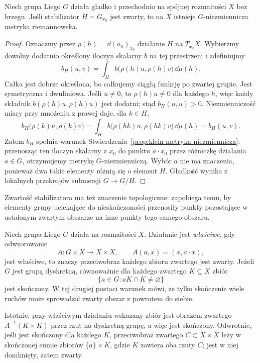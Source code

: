 \begin{stwierdzenie}
\label{prop:klein-zwarty-stabilizator-metryka}
Niech grupa Liego $G$ działa gładko i przechodnio na spójnej
rozmaitości $X$ bez brzegu. Jeśli stabilizator $H=G_{x_0}$ jest
zwarty, to na $X$ istnieje $G$-niezmiennicza metryka
riemannowska.
\end{stwierdzenie}
\begin{proof}
Oznaczmy przez $\rho(h)=\dd(a_h)_{x_0}$ działanie $H$
na $T_{x_0}X$. Wybierzmy dowolny dodatnio określony iloczyn
skalarny $b$ na tej przestrzeni i zdefiniujmy
\[
 b_H(u,v)=\int_H b\bigl(\rho(h)u,\rho(h)v\bigr)\,\dd\mu(h).
\]
Całka jest dobrze określona, bo całkujemy ciągłą funkcję po
zwartej grupie. Jest symetryczna i dwuliniowa. Jeśli $u\ne0$,
to $\rho(h)u\ne0$ dla każdego $h$, więc każdy składnik
$b(\rho(h)u,\rho(h)u)$ jest dodatni; stąd $b_H(u,u)>0$.
Niezmienniczość miary przy mnożeniu z prawej daje, dla $k\in H$,
\[
 b_H\bigl(\rho(k)u,\rho(k)v\bigr)
 =\int_H b\bigl(\rho(hk)u,\rho(hk)v\bigr)\,\dd\mu(h)
 =b_H(u,v).
\]
Zatem $b_H$ spełnia warunek
Stwierdzenia~\ref{prop:klein-metryka-niezmiennicza}:
przenosząc ten iloczyn skalarny z $x_0$ do punktu
$a\cdot x_0$ przez różniczkę działania $a\in G$, otrzymujemy
metrykę $G$-niezmienniczą. Wybór $a$ nie ma znaczenia,
ponieważ dwa takie elementy różnią się o element $H$.
Gładkość wynika z lokalnych przekrojów submersji $G\to G/H$.
\end{proof}

Zwartość stabilizatora ma też znaczenie topologiczne: zapobiega
temu, by elementy grupy uciekające do nieskończoności przenosiły
punkty pozostające w ustalonym zwartym obszarze na inne punkty
tego samego obszaru.

\begin{definicja}
\label{def:klein-dzialanie-wlasciwe}
Niech grupa Liego $G$ działa na rozmaitości $X$.
Działanie jest \emph{właściwe}, gdy odwzorowanie
\[
 A:G\times X\longrightarrow X\times X,
 \qquad A(a,x)=(x,a\cdot x),
\]
jest właściwe, to znaczy przeciwobraz każdego zbioru zwartego
jest zwarty. Jeżeli $G$ jest grupą dyskretną, równoważnie
dla każdego zwartego $K\subseteq X$ zbiór
\[
 \{a\in G:aK\cap K\ne\varnothing\}
\]
jest skończony. W tej drugiej postaci warunek mówi, że tylko
skończenie wiele ruchów może sprowadzić zwarty obszar z powrotem
do siebie.
\end{definicja}

Istotnie, przy właściwym działaniu wskazany zbiór jest obrazem
zwartego $A^{-1}(K\times K)$ przez rzut na dyskretną grupę,
a więc jest skończony. Odwrotnie, jeśli jest skończony dla
każdego $K$, przeciwobraz zwartego $C\subset X\times X$ leży
w skończonej sumie zbiorów $\{a\}\times K$, gdzie $K$ zawiera
oba rzuty $C$; jest w niej domknięty, zatem zwarty.

